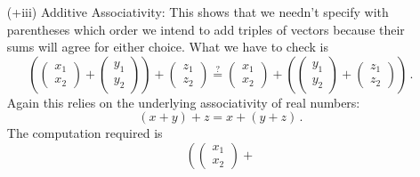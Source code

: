 {\begin{enumerate}
This again relies on the underlying real numbers which for any $x,y\in {\mathbb R}$ obey 
\[x+y=y+x\, .\]
This fact underlies the middle step of the following computation
\[
\begin{pmatrix}x_1\\x_2\end{pmatrix}+
\begin{pmatrix}y_1\\y_2\end{pmatrix}
=
\begin{pmatrix}x_1+y_1\\x_2+y_2\end{pmatrix}
=
\begin{pmatrix}y_1+x_1\\y_2+x_2\end{pmatrix}
=
\begin{pmatrix}y_1\\y_2\end{pmatrix}+
\begin{pmatrix}x_1\\x_2\end{pmatrix}\, ,\]
which demonstrates what we wished to show.
\item[(+iii)] Additive Associativity:
This shows that we needn't specify with parentheses which 
order we intend to add triples of vectors because their sums 
will agree for either choice. What we have to check is
\[
\left(\begin{pmatrix}x_1\\x_2\end{pmatrix}+
\begin{pmatrix}y_1\\y_2\end{pmatrix}\right)+
\begin{pmatrix}z_1\\z_2\end{pmatrix}
\stackrel?=
\begin{pmatrix}x_1\\x_2\end{pmatrix}+
\left(\begin{pmatrix}y_1\\y_2\end{pmatrix}+
\begin{pmatrix}z_1\\z_2\end{pmatrix}\right)\, .\]
Again this relies on the underlying associativity of real numbers:
\[
(x+y)+z=x+(y+z)\, .
\]
The computation required is
\[
\left(\begin{pmatrix}x_1\\x_2\end{pmatrix}+
\]
\end{enumerate}}
